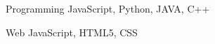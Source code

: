 


\begin{cvskills}


\cvskill
{Programming} %
{JavaScript, Python, JAVA, C++} %


\cvskill
{Web} %
{JavaScript, HTML5, CSS} %


\end{cvskills}